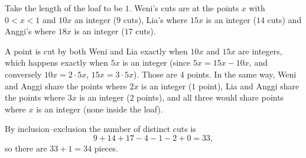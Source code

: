 Take the length of the loaf to be $1$. Weni's cuts are at the points $x$ with $0<x<1$ and $10x$ an integer ($9$ cuts), Lia's where $15x$ is an integer ($14$ cuts) and Anggi's where $18x$ is an integer ($17$ cuts).

A point is cut by both Weni and Lia exactly when $10x$ and $15x$ are integers, which happens exactly when $5x$ is an integer (since $5x=15x-10x$, and conversely $10x=2\cdot5x$, $15x=3\cdot5x$). Those are $4$ points. In the same way, Weni and Anggi share the points where $2x$ is an integer ($1$ point), Lia and Anggi share the points where $3x$ is an integer ($2$ points), and all three would share points where $x$ is an integer (none inside the loaf).

By inclusion--exclusion the number of distinct cuts is
\[9+14+17-4-1-2+0=33,\]
so there are $33+1=\boxed{34}$ pieces.
